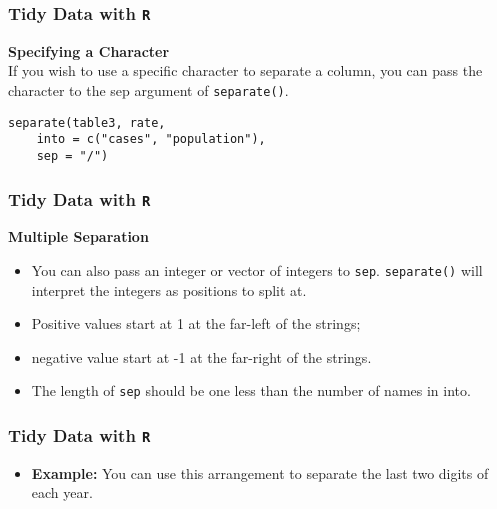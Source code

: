 \documentclass[TIDYMASTER.tex]{subfiles}
\begin{document}
\begin{frame}[fragile]
	\frametitle{Tidy Data with \texttt{R}}
	\Large
\noindent \textbf{Specifying a Character} \\
If you wish to use a specific character to separate a column, you can pass the character to the sep argument of \texttt{separate()}. 

\begin{framed}
\begin{verbatim}
separate(table3, rate, 
    into = c("cases", "population"), 
    sep = "/")
\end{verbatim}
\end{framed}
\end{frame}
\begin{frame}[fragile]
\frametitle{Tidy Data with \texttt{R}}
\Large
\noindent \textbf{Multiple Separation}

\begin{itemize}
\item You can also pass an integer or vector of integers to \texttt{sep}. \texttt{separate()} will interpret the integers as positions to split at.

\item  Positive values start at 1 at the far-left of the strings; \item negative value start at -1 at the far-right of the strings. 
		
		\item The length of \texttt{sep} should be one less than the number of names in into. 
\end{itemize}
\end{frame}
\begin{frame}[fragile]
	\frametitle{Tidy Data with \texttt{R}}
	\Large

	\begin{itemize}
		

\item \textbf{Example:} You can use this arrangement to separate the last two digits of each year.
\end{itemize}

\end{frame}
\end{document}
